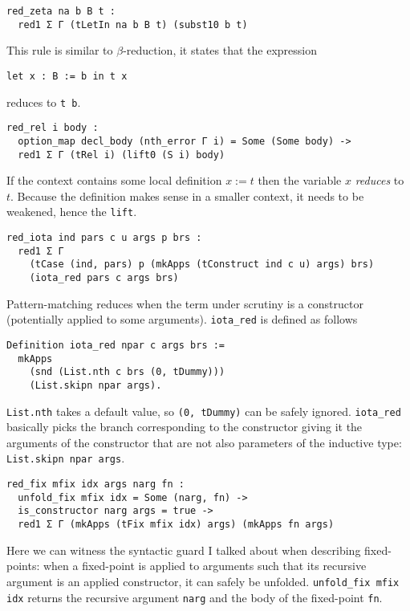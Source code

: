 \begin{verbatim}
red_zeta na b B t :
  red1 Σ Γ (tLetIn na b B t) (subst10 b t)
\end{verbatim}
This rule is similar to \(\beta\)-reduction, it states that the expression
\begin{verbatim}
let x : B := b in t x
\end{verbatim}
reduces to \texttt{t b}.

\begin{verbatim}
red_rel i body :
  option_map decl_body (nth_error Γ i) = Some (Some body) ->
  red1 Σ Γ (tRel i) (lift0 (S i) body)
\end{verbatim}
If the context contains some local definition \(x := t\) then the variable
\(x\) \emph{reduces} to \(t\). Because the definition makes sense in a
smaller context, it needs to be weakened, hence the \texttt{lift}.

\begin{verbatim}
red_iota ind pars c u args p brs :
  red1 Σ Γ
    (tCase (ind, pars) p (mkApps (tConstruct ind c u) args) brs)
    (iota_red pars c args brs)
\end{verbatim}
Pattern-matching reduces when the term under scrutiny is a constructor
(potentially applied to some arguments).
\texttt{iota_red} is defined as follows
\begin{verbatim}
Definition iota_red npar c args brs :=
  mkApps
    (snd (List.nth c brs (0, tDummy)))
    (List.skipn npar args).
\end{verbatim}
\texttt{List.nth} takes a default value, so
\texttt{(0, tDummy)} can be safely ignored.
%
\texttt{iota_red}
basically picks the branch corresponding to the constructor giving it the
arguments of the constructor that are not also parameters of the inductive type:
\texttt{List.skipn npar args}.

\begin{verbatim}
red_fix mfix idx args narg fn :
  unfold_fix mfix idx = Some (narg, fn) ->
  is_constructor narg args = true ->
  red1 Σ Γ (mkApps (tFix mfix idx) args) (mkApps fn args)
\end{verbatim}
Here we can witness the syntactic guard I talked about when describing
fixed-points: when a fixed-point is applied to arguments such that its recursive
argument is an applied constructor, it can safely be unfolded.
\texttt{unfold_fix mfix idx} returns the recursive argument
\texttt{narg} and the body of the fixed-point \texttt{fn}.

